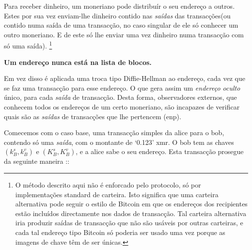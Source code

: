 Para receber dinheiro, um moneriano pode distribuír o seu endereço a outros. Estes por sua vez enviam-lhe dinheiro contido nas {\em saídas} das transacções\newline(ou contido numa saída de uma transacção, no caso singular de ele só conhecer um outro moneriano. E de este só lhe enviar uma vez dinheiro numa transacção com só uma saída).
\footnote{O método descrito aqui não é enforcado pelo protocolo, só por implementações standard de carteira. Isto significa que uma carteira alternativa pode seguir o estilo de Bitcoin em que os endereços dos recipientes estão incluídos directamente nos dados de transacção. Tal carteira alternativa iria produzir saídas de transacção que não são usáveis por outras carteiras, e cada tal endereço tipo Bitcoin só poderia ser usado uma vez porque as imagens de chave têm de ser únicas.}
\\
\centerline{{\bf Um endereço nunca está na lista de blocos.}}
\newline
\newline
Em vez disso é aplicada uma troca tipo Diffie-Hellman ao endereço, cada vez que se faz uma transacção para esse endereço. O que gera assim um {\em endereço oculto} único, para cada {\em saída} de transacção.\newline
Desta forma, observadores externos, que conhecem todos os endereços de um certo moneriano, são incapazes de verificar quais são as {\em saídas} de transacções que lhe pertencem (enp).


Comecemos com o caso base, uma transacção simples da alice para o bob, contendo só uma {\em saída}, com o montante de `0.123' xmr.\newline
O bob tem as chaves $(k_B^s, k_B^v)$ e $(K_B^s, K_B^v)$, e a alice sabe o seu endereço.
Esta transacção prosegue da seguinte maneira :\cite{cryptoNoteWhitePaper}:

